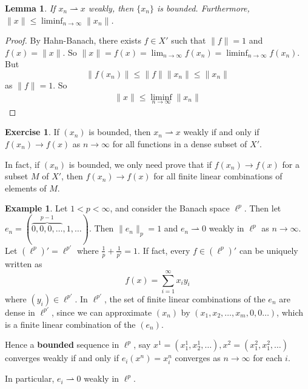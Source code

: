 \documentclass[10pt, oneside, reqno]{amsart}
\theoremstyle{plain}%
\newtheorem{lem}[thm]{Lemma}
\numberwithin{equation}{section}
\theoremstyle{definition}
\newtheorem{exmp}[thm]{Example}
\newtheorem{exer}[thm]{Exercise}
\theoremstyle{remark}
\begin{document}
\begin{lem}
    If $x_n \rightharpoonup x$ weakly, then $\{ x_n \}$ is bounded. Furthermore, $\| x \| \leq \liminf_{n \rightarrow \infty} \| x_n \|$.    
\end{lem}

\begin{proof}
    By Hahn-Banach, there exists $f \in X'$ such that $\| f \| = 1$ and $f(x) = \| x \|$.  So $\| x \| = f(x) = \lim_{n \rightarrow \infty} f(x_n) = \liminf_{n \rightarrow \infty} f(x_n)$.  But \[
        \| f(x_n) \| \leq \| f \| \| x_n \| \leq \| x_n \| 
    \] as $\| f \| = 1$.  So \begin{align*}
        \| x \| \leq \liminf_{n \rightarrow \infty} \| x_n \|
    \end{align*}
    
\end{proof}  

\begin{exer}
    If $(x_n)$ is bounded, then $x_n \rightharpoonup x$ weakly if and only if $f(x_n) \rightarrow f(x)$ as $n \rightarrow \infty$ for all functions in a dense subset of $X'$. 
    
    In fact, if $(x_n)$ is bounded, we only need prove that if $f(x_n) \rightarrow f(x)$ for a subset $M$ of $X'$, then $f(x_n) \rightarrow f(x)$ for all finite linear combinations of elements of $M$.     
\end{exer}

\begin{exmp}
    Let $1 < p < \infty$, and consider the Banach space $\ell^p$.  Then let $e_n = (\overbrace{0, 0, 0, \dots}^{p-1}, 1, \dots)$.  Then $\| e_n \|_p = 1$ and $e_n \rightharpoonup 0$ weakly in $\ell^p$ as $n \rightarrow \infty$.  Let $\left(\ell^p \right)' = \ell^{p'}$ where $\frac{1}{p} + \frac{1}{p'} = 1$.  If fact, every $f \in \left( \ell^p \right)'$ can be uniquely written as \[
        f(x) = \sum_{i=1}^\infty x_i y_i
    \] where $(y_i) \in \ell^{p'}$.  In $\ell^{p'}$, the set of finite linear combinations of the $e_n$ are dense in $\ell^{p'}$, since we can approximate $(x_n)$ by $(x_1, x_2,\dots, x_m, 0, 0 \dots)$, which is a finite linear combination of the $(e_n)$.  
    
    Hence a \textbf{bounded} sequence in $\ell^p$, say $x^1 = (x^1_1, x^1_2, \dots), x^2 = (x^2_1, x^2_1, \dots)$ converges weakly if and only if $e_i(x^n) = x^n_i$ converges as $n \rightarrow \infty$ for each $i$.

    In particular, $e_i \rightharpoonup 0$ weakly in $\ell^p$.  
\end{exmp}
\end{document}

